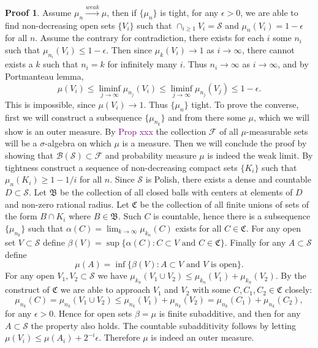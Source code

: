 \documentclass[hidelinks,11pt]{article}
\theoremstyle{definition}
\theoremstyle{dotless}
\newtheorem{prop}{Proof}[section]
\theoremstyle{remark}
\DeclareMathOperator{\1}{\mathbf{1}}
\DeclareMathOperator{\0}{\mathbf{0}}
\begin{document}
\begin{prop}
Assume $\mu_n\xrightarrow{weak}\mu$, then if $\{\mu_n\}$ is tight, for any $\epsilon>0$, we are able to find non-decreasing open sets $\{V_i\}$ such that $\cap_{i\geq1}V_i=\mathcal{S}$ and $\mu_n(V_i)=1-\epsilon$ for all $n$. Assume the contrary for contradiction, there exists for each $i$ some $n_i$ such that $\mu_{n_i}(V_i)\leq1-\epsilon$. Then since $\mu_k(V_i)\to1$ as $i\to\infty$, there cannot exists a $k$ such that $n_i=k$ for infinitely many $i$. Thus $n_i\to\infty$ as $i\to\infty$, and by Portmanteau lemma,
\[\mu(V_i)\leq\liminf_{j\to\infty}\mu_{n_j}(V_i)\leq\liminf_{j\to\infty}\mu_{n_j}(V_j)\leq1-\epsilon.\]
This is impossible, since $\mu(V_i)\to1$. Thus $\{\mu_n\}$ tight.\medbreak
To prove the converse, first we will construct a subsequence $\{\mu_{n_k}\}$ and from there some $\mu$, which we will show is an outer measure. By \textcolor{purple}{Prop xxx} the collection $\mathcal{F}$ of all $\mu$-measurable sets will be a $\sigma$-algebra on which $\mu$ is a measure. Then we will conclude the proof by showing that $\mathcal{B}(\mathcal{S})\subset\mathcal{F}$ and probability measure $\mu$ is indeed the weak limit.\medbreak
By tightness construct a sequence of non-decreasing compact sets $\{K_i\}$ such that $\mu_n(K_i)\geq1-1/i$ for all $n$. Since $\mathcal{S}$ is Polish, there exists a dense and countable $D\subset\mathcal{S}$. Let $\mathfrak{B}$ be the collection of all closed balls with centers at elements of $D$ and non-zero rational radius. Let $\mathfrak{C}$ be the collection of all finite unions of sets of the form $B\cap K_i$ where $B\in\mathfrak{B}$. Such $C$ is countable, hence there is a subsequence $\{\mu_{n_k}\}$ such that $\alpha(C)=\lim_{k\to\infty}\mu_{k_n}(C)$ exists for all $C\in\mathfrak{C}$. For any open set $V\subset\mathcal{S}$ define $\beta(V)=\sup\{\alpha(C):C\subset V\textrm{ and }C\in\mathfrak{C}\}$. Finally for any $A\subset\mathcal{S}$ define
\[\mu(A)=\inf\{\beta(V):A\subset V\textrm{ and }V\textrm{ is open}\}.\]
For any open $V_1,V_2\subset\mathcal{S}$ we have $\mu_{k_n}(V_1\cup V_2)\leq\mu_{k_n}(V_1)+\mu_{k_n}(V_2)$. By the construct of $\mathfrak{C}$ we are able to approach $V_1$ and $V_2$ with some $C,C_1,C_2\in\mathfrak{C}$ closely: 
\[\mu_{n_k}(C)=\mu_{n_k}(V_1\cup V_2)\leq\mu_{n_k}(V_1)+\mu_{n_k}(V_2)=\mu_{n_k}(C_1)+\mu_{n_k}(C_2),\]
for any $\epsilon>0$. Hence for open sets $\beta=\mu$ is finite subadditive, and then for any $A\subset\mathcal{S}$ the property also holds. The countable subadditivity follows by letting $\mu(V_i)\leq\mu(A_i)+2^{-i}\epsilon$. Therefore $\mu$ is indeed an outer measure.\medbreak

\end{prop}
\end{document}
